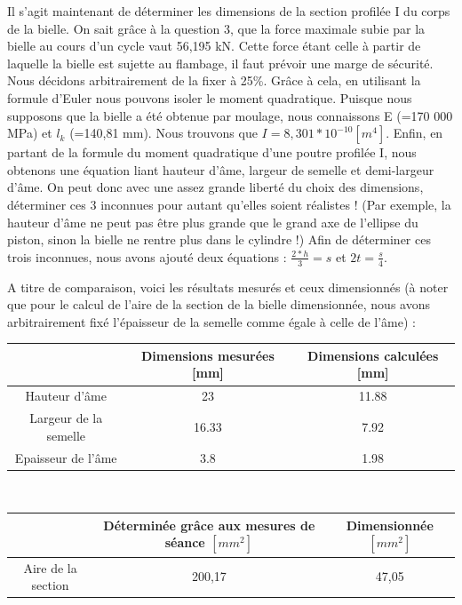 \documentclass[a4paper,oneside,12pt]{report}
\begin{document}
Il s'agit maintenant de déterminer les dimensions de la section profilée I du corps de la bielle. On sait grâce à la question 3, que la force maximale subie par la bielle au cours d'un cycle vaut 56,195 kN. Cette force étant celle à partir de laquelle la bielle est sujette au flambage, il faut prévoir une marge de sécurité. Nous décidons arbitrairement de la fixer à 25\%. Grâce à cela, en utilisant la formule d'Euler nous pouvons isoler le moment quadratique. Puisque nous supposons que la bielle a été obtenue par moulage, nous connaissons E (=170 000 MPa) et $l_k$ (=140,81 mm). Nous trouvons que $I = 8,301*10^{-10} [m^4]$. Enfin, en partant de la formule du moment quadratique d'une poutre profilée I, nous obtenons une équation liant hauteur d'âme, largeur de semelle et demi-largeur d'âme. On peut donc avec une assez grande liberté du choix des dimensions, déterminer ces 3 inconnues pour autant qu'elles soient réalistes ! (Par exemple, la hauteur d'âme ne peut pas être plus grande que le grand axe de l'ellipse du piston, sinon la bielle ne rentre plus dans le cylindre !)
Afin de déterminer ces trois inconnues, nous avons ajouté deux équations : $\frac{2*h}{3} = s$ et $2t=\frac{s}{4}$.

A titre de comparaison, voici les résultats mesurés et ceux dimensionnés 
(à noter que pour le calcul de l'aire de la section de la bielle dimensionnée, nous avons arbitrairement fixé l'épaisseur de la semelle comme égale à celle de l'âme) :

\begin{center}
\begin{tabular}{|c||c|c|}
\hline 
\ & Dimensions mesurées [mm]  & Dimensions calculées [mm] \\ 
\hline 
Hauteur d'âme & 23 & 11.88 \\ 
\hline 
Largeur de la semelle & 16.33 & 7.92 \\ 
\hline 
Epaisseur de l'âme & 3.8 & 1.98 \\
\hline
\end{tabular} \\
\end{center}

\begin{center}
\begin{tabular}{|c||c|c|}
\hline 
\ & Déterminée grâce aux mesures de séance $[mm^2]$ & Dimensionnée $[mm^2]$ \\
\hline
Aire de la section & 200,17  &  47,05 \\
\hline
\end{tabular} \\
\end{center}
\end{document}
